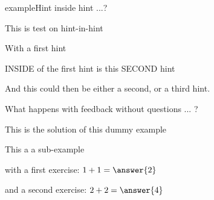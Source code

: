 \documentclass{ximera}
\begin{document}
    \begin{expandable}{example}{Hint inside hint ...?}
        
        This is test on hint-in-hint 

        \begin{hint} With a first hint 
            \begin{hint} INSIDE of the first hint is this SECOND hint\end{hint}
        \end{hint}

        \begin{hint} And this could then be either a second, or a third hint.
        \end{hint}

        \begin{feedback} What happens with feedback without questions ... ?
        \end{feedback}
        
        \begin{oplossing} This is the solution of this dummy example
        \end{oplossing}

        \begin{example} This a a sub-example
        
            \begin{exercise} with a first exercise: 
                $1+1=\answer{2}$
                \begin{exercise} and a second exercise: $2+2=\answer{4}$

                \end{exercise}
            \end{exercise}
        \end{example}

    \end{expandable}   
\end{document}
